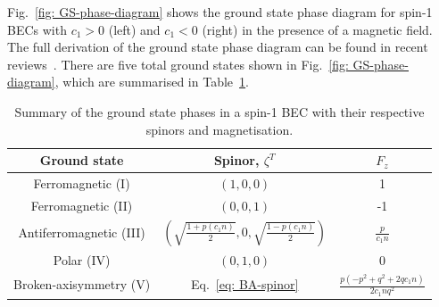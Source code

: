 Fig.~\ref{fig: GS-phase-diagram} shows the ground state phase diagram for spin-1
BECs with \(c_1 > 0\) (left) and \(c_1 < 0\) (right) in the presence of a
magnetic field.
The full derivation of the ground state phase diagram can be found in recent
reviews~\cite{Kawaguchi2012, StamperKurn2013}.
There are five total ground states shown in Fig.~\ref{fig: GS-phase-diagram},
which are summarised in Table~\ref{tab: spin-1-ground-states}.
\begin{table}
    \centering
    \begin{tabular}{ccc}
        \toprule
        Ground state                          & Spinor, \(\zeta^T\)                      & \(F_z\) \\
        \midrule
        Ferromagnetic (I)                     & \((1, 0, 0)\)                            & 1       \\
        Ferromagnetic (II)                    & \((0, 0, 1)\)                            & -1      \\
        Antiferromagnetic (III)               & \(\left(\sqrt{\frac{1 + p(c_1n)}{2}}, 0,
        \sqrt{\frac{1 - p(c_1n)}{2}}\right)\) & \(\frac{p}{c_1n}\)                                 \\
        Polar (IV)                            & \((0, 1, 0)\)                            & 0       \\
        Broken-axisymmetry (V)                & Eq.~\eqref{eq: BA-spinor}
                                              & \(\frac{p(-p^2+q^2+2qc_1n)}{2c_1nq^2}\)            \\
        \bottomrule
    \end{tabular}
    \caption{\label{tab: spin-1-ground-states}Summary of the ground state
        phases in a spin-1 BEC with their respective spinors and magnetisation.}
\end{table}

